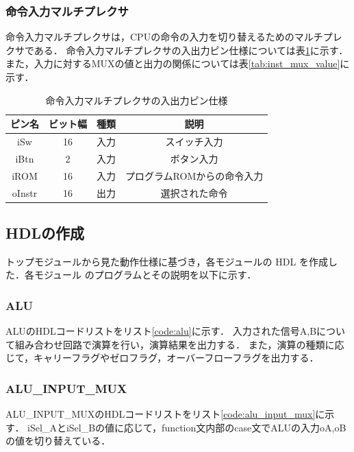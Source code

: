 \documentclass[a4paper,11pt]{ltjsarticle}
\begin{document}
\subsubsection{命令入力マルチプレクサ}
命令入力マルチプレクサは，CPUの命令の入力を切り替えるためのマルチプレクサである．
命令入力マルチプレクサの入出力ピン仕様については表\ref{tab:inst_mux}に示す．
また，入力に対するMUXの値と出力の関係については表\ref{tab:inst_mux_value}に示す．

\begin{table}[H]
    \centering
    \caption{命令入力マルチプレクサの入出力ピン仕様}
    \label{tab:inst_mux}
    \begin{tabular}{|c|c|c|c|}
        \hline
        ピン名    & ビット幅 & 種類 & 説明              \\
        \hline
        iSw    & 16   & 入力 & スイッチ入力          \\
        \hline
        iBtn   & 2    & 入力 & ボタン入力           \\
        \hline
        iROM   & 16   & 入力 & プログラムROMからの命令入力 \\
        \hline
        oInstr & 16   & 出力 & 選択された命令         \\
        \hline
    \end{tabular}
\end{table}
\subsection{HDLの作成}
トップモジュールから見た動作仕様に基づき，各モジュールの HDL を作成した．各モジュール
のプログラムとその説明を以下に示す．
\subsubsection{ALU}
ALUのHDLコードリストをリスト\ref{code:alu}に示す．
入力された信号A,Bについて組み合わせ回路で演算を行い，演算結果を出力する．
また，演算の種類に応じて，キャリーフラグやゼロフラグ，オーバーフローフラグを出力する．
\subsubsection{ALU\_INPUT\_MUX}
ALU\_INPUT\_MUXのHDLコードリストをリスト\ref{code:alu_input_mux}に示す．
iSel\_AとiSel\_Bの値に応じて，function文内部のcase文でALUの入力oA,oBの値を切り替えている．
\end{document}
